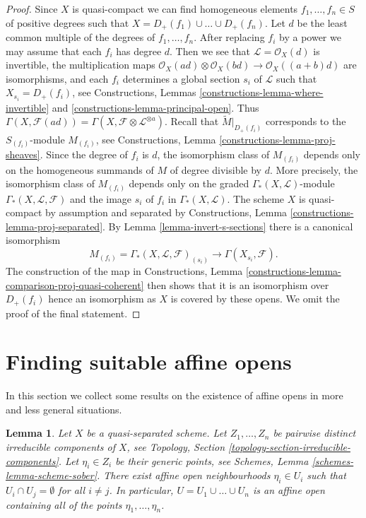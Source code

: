 \documentclass{stacks-project}
\theoremstyle{plain}
\newtheorem{lemma}[subsection]{Lemma}
\theoremstyle{definition}
\theoremstyle{remark}
\numberwithin{equation}{subsection}
\begin{document}
\begin{proof}
Since $X$ is quasi-compact we can find homogeneous elements
$f_1, \ldots, f_n \in S$ of positive degrees such that
$X = D_+(f_1) \cup \ldots \cup D_+(f_n)$. Let $d$ be the
least common multiple of the degrees of $f_1, \ldots, f_n$.
After replacing $f_i$ by a power we may assume that each
$f_i$ has degree $d$. Then we see that $\mathcal{L} = \mathcal{O}_X(d)$ is
invertible, the multiplication maps
$\mathcal{O}_X(ad) \otimes \mathcal{O}_X(bd) \to \mathcal{O}_X((a + b)d)$
are isomorphisms, and each $f_i$ determines a global section $s_i$
of $\mathcal{L}$ such that $X_{s_i} = D_+(f_i)$, see
Constructions, Lemmas \ref{constructions-lemma-where-invertible} and
\ref{constructions-lemma-principal-open}.
Thus $\Gamma(X, \mathcal{F}(ad)) =
\Gamma(X, \mathcal{F} \otimes \mathcal{L}^{\otimes a})$.
Recall that $\widetilde{M}|_{D_{+}(f_i)}$ corresponds to the
$S_{(f_i)}$-module $M_{(f_i)}$, see
Constructions, Lemma \ref{constructions-lemma-proj-sheaves}.
Since the degree of $f_i$ is $d$, the isomorphism class of
$M_{(f_i)}$ depends only on the homogeneous summands of $M$ of
degree divisible by $d$. More precisely, the isomorphism class of
$M_{(f_i)}$ depends only on the graded $\Gamma_*(X, \mathcal{L})$-module
$\Gamma_*(X, \mathcal{L}, \mathcal{F})$
and the image $s_i$ of $f_i$ in $\Gamma_*(X, \mathcal{L})$.
The scheme $X$ is quasi-compact by assumption and
separated by Constructions, Lemma \ref{constructions-lemma-proj-separated}.
By Lemma \ref{lemma-invert-s-sections} there is a canonical isomorphism
$$
M_{(f_i)} = \Gamma_*(X, \mathcal{L}, \mathcal{F})_{(s_i)} \to
\Gamma(X_{s_i}, \mathcal{F}).
$$
The construction of the map in Constructions, Lemma
\ref{constructions-lemma-comparison-proj-quasi-coherent}
then shows that it is an isomorphism over $D_+(f_i)$
hence an isomorphism as $X$ is covered by these opens.
We omit the proof of the final statement.
\end{proof}




\section{Finding suitable affine opens}
\label{section-finding-affine-opens}

\noindent
In this section we collect some results on the existence of
affine opens in more and less general situations.

\begin{lemma}
\label{lemma-maximal-points-affine}
Let $X$ be a quasi-separated scheme.
Let $Z_1, \ldots, Z_n$ be pairwise distinct irreducible components of $X$,
see Topology, Section \ref{topology-section-irreducible-components}.
Let $\eta_i \in Z_i$ be their generic points, see
Schemes, Lemma \ref{schemes-lemma-scheme-sober}.
There exist affine open neighbourhoods $\eta_i \in U_i$
such that $U_i \cap U_j = \emptyset$ for all $i \not = j$.
In particular, $U = U_1 \cup \ldots \cup U_n$ is an affine
open containing all of the points $\eta_1, \ldots, \eta_n$.
\end{lemma}
\end{document}
